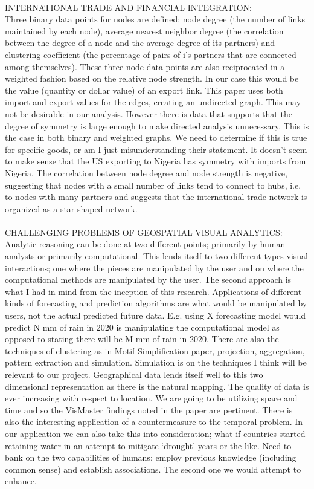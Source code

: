 \\
INTERNATIONAL TRADE AND FINANCIAL INTEGRATION: ~\cite{schiavo2010international}\\
Three binary data points for nodes are defined; node degree (the number of links maintained by each node), average nearest neighbor degree (the correlation between the degree of a node and the average degree of its partners) and clustering coefficient (the percentage of pairs of i's partners that are connected among themselves). These three node data points are also reciprocated in a weighted fashion based on the relative node strength. In our case this would be the value (quantity or dollar value) of an export link.
This paper uses both import and export values for the edges, creating an undirected graph. This may not be desirable in our analysis. However there is data that supports that the degree of symmetry is large enough to make directed analysis unnecessary. This is the case in both binary and weighted graphs. We need to determine if this is true for specific goods, or am I just misunderstanding their statement. It doesn’t seem to make sense that the US exporting to Nigeria has symmetry with imports from Nigeria. The correlation between node degree and node strength is negative, suggesting that nodes with a small number of links tend to connect to hubs, i.e. to nodes with many partners and suggests that the international trade network is organized as a star-shaped network.\\
\\
CHALLENGING PROBLEMS OF GEOSPATIAL VISUAL ANALYTICS: ~\cite{andrienko2011challenging}\\
Analytic reasoning can be done at two different points; primarily by human analysts or primarily computational. This lends itself to two different types visual interactions; one where the pieces are manipulated by the user and on where the computational methods are manipulated by the user.  The second approach is what I had in mind from the inception of this research. Applications of different kinds of forecasting and prediction algorithms are what would be manipulated by users, not the actual predicted future data. E.g. using X forecasting model would predict N mm of rain in 2020 is manipulating the computational model as opposed to stating there will be M mm of rain in 2020. There are also the techniques of clustering as in Motif Simplification paper, projection, aggregation, pattern extraction and simulation. Simulation is on the techniques I think will be relevant to our project.
Geographical data lends itself well to this two dimensional representation as there is the natural mapping. The quality of data is ever increasing with respect to location. We are going to be utilizing space and time and so the VisMaster findings noted in the paper are pertinent. There is also the interesting application of a countermeasure to the temporal problem. In our application we can also take this into consideration; what if countries started retaining water in an attempt to mitigate ‘drought’ years or the like. Need to bank on the two capabilities of humans; employ previous knowledge (including common sense) and establish associations. The second one we would attempt to enhance.\\
